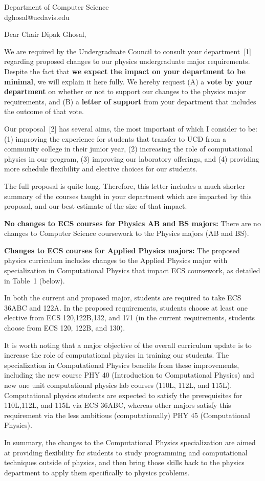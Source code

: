 \documentclass[letterpaper,12pt]{letter}
\def\letterparta{
We are required by the Undergraduate Council to consult your
department~[1] regarding proposed changes to our physics undergraduate major requirements.  Despite the fact that {\bf we expect the
  impact on your department to be minimal}, we will explain it here
fully.  We hereby request (A) a {\bf vote by your department} on
whether or not to support our changes to the physics major
requirements, and (B) a {\bf letter of support} from your department
that includes the outcome of that vote.

Our proposal~[2] has several aims, the most important of which I
consider to be: (1) improving the experience for students that
transfer to UCD from a community college in their junior year, (2)
increasing the role of computational physics in our program, (3)
improving our laboratory offerings, and (4) providing more schedule
flexibility and elective choices for our students.

The full proposal is quite long.  Therefore, this letter includes a
much shorter summary of the courses taught in your department which
are impacted by this proposal, and our best estimate of the size of
that impact.
}
\begin{document}
\begin{letter}{Department of Computer Science  \\ dghosal@ucdavis.edu}
\opening{Dear Chair Dipak Ghosal,}

\letterparta


{\bf No changes to ECS courses for Physics AB and BS majors:} There are no changes to Computer Science coursework to the Physics
majors (AB and BS).

{\bf Changes to ECS courses for Applied Physics majors:} The proposed physics curriculum includes changes to the Applied
Physics major with specialization in Computational Physics that impact
ECS coursework, as detailed in Table~1 (below).

In both the current and proposed major, students are required to take
ECS 36ABC and 122A.  In the proposed requirements, students choose at
least one elective from ECS 120,122B,132, and 171 (in the current
requirements, students choose from ECS 120, 122B, and 130).

It is worth noting that a major objective of the overall curriculum
update is to increase the role of computational physics in training
our students.  The specialization in Computational Physics benefits
from these improvements, including the new course PHY 40 (Introduction
to Computational Physics) and new one unit computational physics lab
courses (110L, 112L, and 115L).  Computational physics students are
expected to satisfy the prerequisites for 110L,112L, and 115L via ECS
36ABC, whereas other majors satisfy this requirement via the less
ambitious (computationally) PHY 45 (Computational Physics).

In summary, the changes to the Computational Physics specialization
are aimed at providing flexibility for students to study programming
and computational techniques outside of physics, and then bring those
skills back to the physics department to apply them specifically to
physics problems.


\end{letter}
\end{document}
